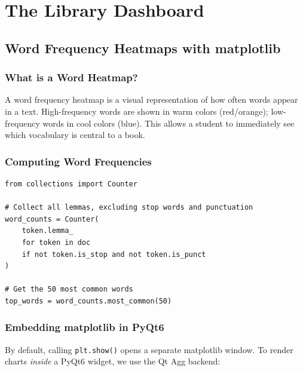 \documentclass[12pt,oneside]{book}
\begin{document}
\part{The Library Dashboard}

\chapter{Word Frequency Heatmaps with matplotlib}
\label{ch:heatmap}

\section{What is a Word Heatmap?}

A word frequency heatmap is a visual representation of how often words appear in a text.
High-frequency words are shown in warm colors (red/orange); low-frequency words in cool
colors (blue). This allows a student to immediately see which vocabulary is central to a
book.

\section{Computing Word Frequencies}

\begin{lstlisting}[caption={Word frequency computation (LLR-17)}]
from collections import Counter

# Collect all lemmas, excluding stop words and punctuation
word_counts = Counter(
    token.lemma_
    for token in doc
    if not token.is_stop and not token.is_punct
)

# Get the 50 most common words
top_words = word_counts.most_common(50)
\end{lstlisting}

\section{Embedding matplotlib in PyQt6}

By default, calling \texttt{plt.show()} opens a separate matplotlib window. To render
charts \textit{inside} a PyQt6 widget, we use the Qt Agg backend:
\end{document}
